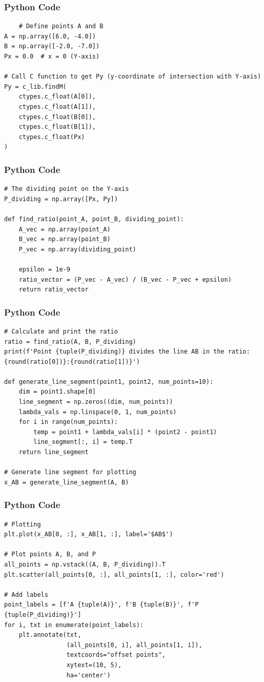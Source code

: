 \documentclass{beamer}
\begin{document}
\begin{frame}[fragile]
    \frametitle{Python Code}
    \begin{lstlisting}
    # Define points A and B
A = np.array([6.0, -4.0])
B = np.array([-2.0, -7.0])
Px = 0.0  # x = 0 (Y-axis)

# Call C function to get Py (y-coordinate of intersection with Y-axis)
Py = c_lib.findM(
    ctypes.c_float(A[0]),
    ctypes.c_float(A[1]),
    ctypes.c_float(B[0]),
    ctypes.c_float(B[1]),
    ctypes.c_float(Px)
)\end{lstlisting}
\end{frame}

\begin{frame}[fragile]
    \frametitle{Python Code}
    \begin{lstlisting}
# The dividing point on the Y-axis
P_dividing = np.array([Px, Py])

def find_ratio(point_A, point_B, dividing_point):
    A_vec = np.array(point_A)
    B_vec = np.array(point_B)
    P_vec = np.array(dividing_point)

    epsilon = 1e-9
    ratio_vector = (P_vec - A_vec) / (B_vec - P_vec + epsilon)
    return ratio_vector

    \end{lstlisting}
    \end{frame}

\begin{frame}[fragile]
    \frametitle{Python Code}
    \begin{lstlisting}
# Calculate and print the ratio
ratio = find_ratio(A, B, P_dividing)
print(f'Point {tuple(P_dividing)} divides the line AB in the ratio: {round(ratio[0])}:{round(ratio[1])}')

def generate_line_segment(point1, point2, num_points=10):
    dim = point1.shape[0]
    line_segment = np.zeros((dim, num_points))
    lambda_vals = np.linspace(0, 1, num_points)
    for i in range(num_points):
        temp = point1 + lambda_vals[i] * (point2 - point1)
        line_segment[:, i] = temp.T
    return line_segment

# Generate line segment for plotting
x_AB = generate_line_segment(A, B)

    \end{lstlisting}
    \end{frame}

\begin{frame}[fragile]
    \frametitle{Python Code}
    \begin{lstlisting}
# Plotting
plt.plot(x_AB[0, :], x_AB[1, :], label='$AB$')

# Plot points A, B, and P
all_points = np.vstack((A, B, P_dividing)).T
plt.scatter(all_points[0, :], all_points[1, :], color='red')

# Add labels
point_labels = [f'A {tuple(A)}', f'B {tuple(B)}', f'P {tuple(P_dividing)}']
for i, txt in enumerate(point_labels):
    plt.annotate(txt,
                 (all_points[0, i], all_points[1, i]),
                 textcoords="offset points",
                 xytext=(10, 5),
                 ha='center')

    \end{lstlisting}
    \end{frame}
\end{document}
